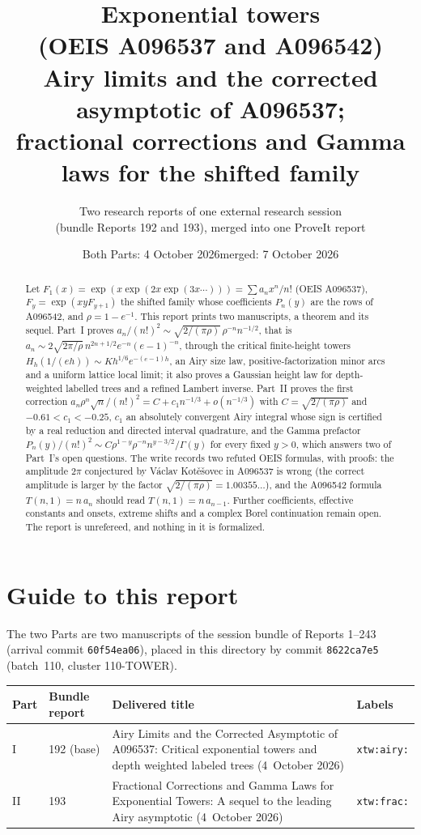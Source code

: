 \documentclass[11pt]{article}
\title{\textbf{Exponential towers\\ (OEIS A096537 and A096542)}\\[7pt]
\large Airy limits and the corrected asymptotic of A096537;\\ fractional corrections and Gamma laws for the shifted family}
\author{Two research reports of one external research session\\(bundle Reports 192 and 193), merged into one ProveIt report}
\date{Both Parts: 4 October 2026\quad merged: 7 October 2026}
\theoremstyle{remark}\newtheorem{remark}[theorem]{Remark}
\begin{document}
\hypersetup{pageanchor=false}
\maketitle
\begin{abstract}
Let $F_1(x)=\exp(x\exp(2x\exp(3x\cdots)))=\sum a_nx^n/n!$ (OEIS A096537), $F_y=\exp(xyF_{y+1})$ the shifted family whose coefficients $P_n(y)$ are the rows of A096542, and $\rho=1-e^{-1}$. This report prints two manuscripts, a theorem and its sequel. Part~I proves $a_n/(n!)^2\sim\sqrt{2/(\pi\rho)}\,\rho^{-n}n^{-1/2}$, that is $a_n\sim2\sqrt{2\pi/\rho}\,n^{2n+1/2}e^{-n}(e-1)^{-n}$, through the critical finite-height towers $H_h(1/(eh))\sim Kh^{1/6}e^{-(e-1)h}$, an Airy size law, positive-factorization minor arcs and a uniform lattice local limit; it also proves a Gaussian height law for depth-weighted labelled trees and a refined Lambert inverse. Part~II proves the first correction $a_n\rho^n\sqrt n/(n!)^2=C+c_1n^{-1/3}+o(n^{-1/3})$ with $C=\sqrt{2/(\pi\rho)}$ and $-0.61<c_1<-0.25$, $c_1$ an absolutely convergent Airy integral whose sign is certified by a real reduction and directed interval quadrature, and the Gamma prefactor $P_n(y)/(n!)^2\sim C\rho^{1-y}\rho^{-n}n^{y-3/2}/\Gamma(y)$ for every fixed $y>0$, which answers two of Part~I's open questions. The write records two refuted OEIS formulas, with proofs: the amplitude $2\pi$ conjectured by V\'aclav Kot\v{e}\v{s}ovec in A096537 is wrong (the correct amplitude is larger by the factor $\sqrt{2/(\pi\rho)}=1.00355\ldots$), and the A096542 formula $T(n,1)=n\,a_n$ should read $T(n,1)=n\,a_{n-1}$. Further coefficients, effective constants and onsets, extreme shifts and a complex Borel continuation remain open. The report is unrefereed, and nothing in it is formalized.
\end{abstract}
\hypersetup{pageanchor=true}
{\small\setlength{\parskip}{0pt}\tableofcontents}
\newpage

\section*{Guide to this report}\label{xtw:sec:guide}
The two Parts are two manuscripts of the session bundle of Reports 1--243
(arrival commit \texttt{60f54ea06}), placed in this directory by commit
\texttt{8622ca7e5} (batch~110, cluster 110-TOWER).
\begin{center}
\small
\begin{tabular}{@{}l l >{\raggedright\arraybackslash}p{} l@{}}
\toprule
Part & Bundle report & Delivered title & Labels\\
\midrule
I & 192 (base) & Airy Limits and the Corrected Asymptotic of A096537: Critical exponential towers and depth weighted labeled trees (4~October 2026) & \texttt{xtw:airy:}\\
II & 193 & Fractional Corrections and Gamma Laws for Exponential Towers: A sequel to the leading Airy asymptotic (4~October 2026) & \texttt{xtw:frac:}\\
\bottomrule
\end{tabular}
\end{center}
\end{document}

